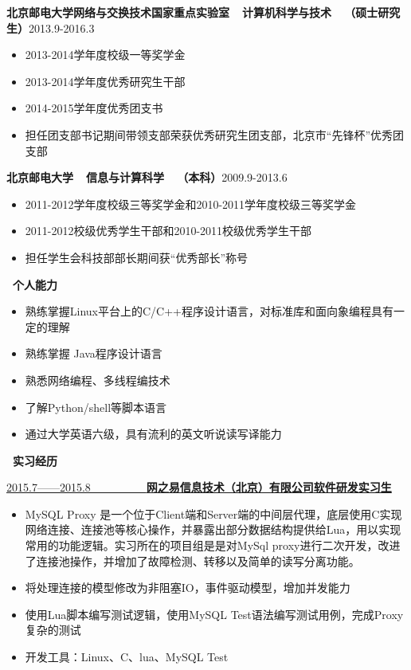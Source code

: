 \documentclass[a4paper,oneside,UTF8, winfonts]{ctexart}
\begin{document}
\indent \textbf{北京邮电大学网络与交换技术国家重点实验室~~计算机科学与技术~~（硕士研究生）}\hfill {}2013.9-2016.3
\begin{itemize}[topsep=0.3em, leftmargin=3pc]
  \setlength{\itemsep}{0pt}
  \setlength{\parsep}{4pt}
  \setlength{\parskip}{4pt}
  \item {}2013-2014学年度校级一等奖学金
  \item {}2013-2014学年度优秀研究生干部
  \item {}2014-2015学年度优秀团支书
  \item {}担任团支部书记期间带领支部荣获优秀研究生团支部，北京市“先锋杯”优秀团支部
\end{itemize}\par
\indent \textbf{北京邮电大学~~信息与计算科学~~（本科）}\hfill {}2009.9-2013.6
\begin{itemize}[topsep=0.3em, leftmargin=3pc]
  \setlength{\itemsep}{0pt}
  \setlength{\parsep}{4pt}
  \setlength{\parskip}{4pt}
  \item {}2011-2012学年度校级三等奖学金和2010-2011学年度校级三等奖学金
  \item {}2011-2012校级优秀学生干部和2010-2011校级优秀学生干部
  \item {}担任学生会科技部部长期间获“优秀部长”称号
\end{itemize}
\noindent \textbf{ \heiti \faCogs\ 个人能力}
\begin{itemize}[topsep=0.3em, leftmargin=3pc]
  \setlength{\itemsep}{0pt}
  \setlength{\parsep}{4pt}
  \setlength{\parskip}{4pt}
  \item {}熟练掌握Linux平台上的C/C++程序设计语言，对标准库和面向象编程具有一定的理解
  \item {}熟练掌握 Java程序设计语言
  \item {}熟悉网络编程、多线程编技术
  \item {}了解Python/shell等脚本语言
  \item {}通过大学英语六级，具有流利的英文听说读写译能力
\end{itemize}
\noindent \textbf{ \heiti \faBriefcase\ 实习经历}\par
\vspace{1.2ex}
\uline{2015.7——2015.8~~~~~~~~~~\bf{网之易信息技术（北京）有限公司}\hfill \bf{软件研发实习生}}
\begin{itemize}[topsep=0.3em, leftmargin=3pc]
  \setlength{\itemsep}{0pt}
  \setlength{\parsep}{4pt}
  \setlength{\parskip}{4pt}
  \item {}MySQL Proxy 是一个位于Client端和Server端的中间层代理，底层使用C实现网络连接、连接池等核心操作，并暴露出部分数据结构提供给Lua，用以实现常用的功能逻辑。实习所在的项目组是是对MySql proxy进行二次开发，改进了连接池操作，并增加了故障检测、转移以及简单的读写分离功能。
  \item {}将处理连接的模型修改为非阻塞IO，事件驱动模型，增加并发能力
  \item {}使用Lua脚本编写测试逻辑，使用MySQL Test语法编写测试用例，完成Proxy复杂的测试
  \item {}开发工具：Linux、C、lua、MySQL Test
\end{itemize}\par
\end{document}

